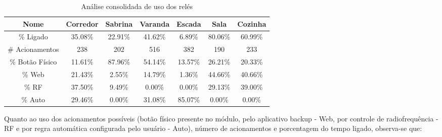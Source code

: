 \begin{table}[H]
	\caption{Análise consolidada de uso dos relés}
	\setlength\tabcolsep{1.5pt}
	\centering
	\footnotesize
	\begin{tabular}{ccccccc}
		\toprule
		\textbf{Nome} &
		\textbf{Corredor} &
		\textbf{Sabrina} &
		\textbf{Varanda} &
		\textbf{Escada} &
		\textbf{Sala} &
		\textbf{Cozinha} \\
		\midrule
		\% Ligado &
		35.08\% &
		22.91\% &
		41.62\% &
		6.89\% &
		80.06\% &
		60.99\% \\
		\# Acionamentos &
		238 &
		202 &
		516 &
		382 &
		190 &
		233 \\
		\% Botão Físico &
		11.61\% &
		87.96\% &
		54.14\% &
		13.57\% &
		26.21\% &
		20.33\% \\
		\% Web &
		21.43\% &
		2.55\% &
		14.79\% &
		1.36\% &
		44.66\% &
		40.66\% \\
		\% RF &
		37.50\% &
		9.49\% &
		0.00\% &
		0.00\% &
		29.13\% &
		39.00\% \\
		\% Auto &
		29.46\% &
		0.00\% &
		31.08\% &
		85.07\% &
		0.00\% &
		0.00\% \\
		\bottomrule
	\end{tabular}
\end{table}

Quanto ao uso dos acionamentos possíveis (botão físico presente no módulo, pelo aplicativo backup - Web, por controle de radiofrequência - RF e por regra automática configurada pelo usuário - Auto), número de acionamentos e porcentagem do tempo ligado, observa-se que:

